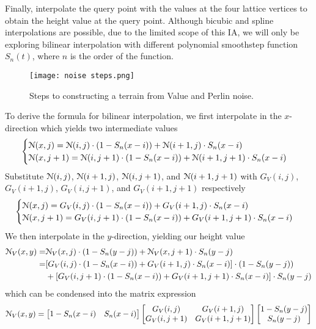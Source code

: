 Finally, interpolate the query point with the values at the four lattice vertices to obtain the height value at the query point. Although
bicubic and spline interpolations are possible, due to the limited scope of this IA, we will only be exploring bilinear interpolation with 
different polynomial smoothstep function $S_n(t)$, where $n$ is the order of the function. 

\begin{figure}[H]
    \centering
    \texttt{[image: noise steps.png]}
    \caption{Steps to constructing a terrain from Value and Perlin noise.}
    \label{fig:noise_steps}
\end{figure}

To derive the formula for bilinear interpolation, we first interpolate in the $x$-direction which yields two intermediate values
\begin{align*}
    \begin{cases}
        \EuScript{N}(x,j)=\EuScript{N}(i,j)\cdot(1-S_n(x-i))+\EuScript{N}(i+1,j)\cdot S_n(x-i)\\
        \EuScript{N}(x,j+1)=\EuScript{N}(i,j+1)\cdot(1-S_n(x-i))+\EuScript{N}(i+1,j+1)\cdot S_n(x-i)
    \end{cases}
\end{align*}
Substitute $\EuScript{N}(i,j)$, $\EuScript{N}(i+1,j)$, $\EuScript{N}(i,j+1)$, and $\EuScript{N}(i+1,j+1)$ with $G_V(i,j)$, $G_V(i+1,j)$,
$G_V(i,j+1)$, and $G_V(i+1,j+1)$ respectively
\begin{align*}
    \begin{cases}
        \EuScript{N}(x,j)=G_V(i,j)\cdot(1-S_n(x-i))+G_V(i+1,j)\cdot S_n(x-i)\\
        \EuScript{N}(x,j+1)=G_V(i,j+1)\cdot(1-S_n(x-i))+G_V(i+1,j+1)\cdot S_n(x-i)
    \end{cases}
\end{align*}
We then interpolate in the $y$-direction, yielding our height value
\begin{align*}
    \EuScript{N}_V(x,y)=&\EuScript{N}_V(x,j)\cdot(1-S_n(y-j))+\EuScript{N}_V(x,j+1)\cdot S_n(y-j) \\
    =&[G_V(i,j)\cdot(1-S_n(x-i))+G_V(i+1,j)\cdot S_n(x-i)]\cdot(1-S_n(y-j))\\
    &+[G_V(i,j+1)\cdot(1-S_n(x-i))+G_V(i+1,j+1)\cdot S_n(x-i)]\cdot S_n(y-j)
\end{align*}
which can be condensed into the matrix expression
\begin{equation} \label{eq:1}
    \EuScript{N}_V(x,y)=
    \begin{bmatrix}
        1-S_n(x-i) & S_n(x-i)
    \end{bmatrix}
    \begin{bmatrix}
        G_V(i,j) & G_V(i+1,j)\\
        G_V(i,j+1) & G_V(i+1,j+1)
    \end{bmatrix}
    \begin{bmatrix}
        1-S_n(y-j)\\
        S_n(y-j)
    \end{bmatrix}
\end{equation}
